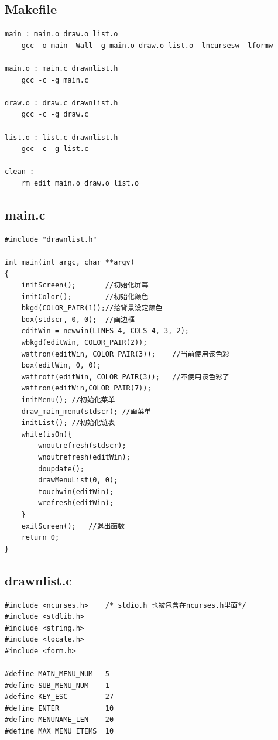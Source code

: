\documentclass[10pt,a4paper]{article}
\begin{document}
\subsection{Makefile}
\begin{footnotesize}
\begin{verbatim}
main : main.o draw.o list.o
	gcc -o main -Wall -g main.o draw.o list.o -lncursesw -lformw

main.o : main.c drawnlist.h
	gcc -c -g main.c 

draw.o : draw.c drawnlist.h
	gcc -c -g draw.c 

list.o : list.c drawnlist.h
	gcc -c -g list.c 

clean :
	rm edit main.o draw.o list.o
\end{verbatim}
\end{footnotesize}
\begin{footnotesize}
\subsection{main.c}
\begin{verbatim}
#include "drawnlist.h"

int main(int argc, char **argv)
{
    initScreen();       //初始化屏幕
    initColor();        //初始化颜色
    bkgd(COLOR_PAIR(1));//给背景设定颜色
    box(stdscr, 0, 0);  //画边框
    editWin = newwin(LINES-4, COLS-4, 3, 2);
    wbkgd(editWin, COLOR_PAIR(2));
    wattron(editWin, COLOR_PAIR(3));    //当前使用该色彩
    box(editWin, 0, 0);
    wattroff(editWin, COLOR_PAIR(3));   //不使用该色彩了
    wattron(editWin,COLOR_PAIR(7));
    initMenu(); //初始化菜单
    draw_main_menu(stdscr); //画菜单
    initList(); //初始化链表
    while(isOn){
        wnoutrefresh(stdscr);
        wnoutrefresh(editWin);
        doupdate();
        drawMenuList(0, 0);
        touchwin(editWin);
        wrefresh(editWin);
    }
    exitScreen();   //退出函数
    return 0;
}
\end{verbatim}
\subsection{drawnlist.c}
\begin{verbatim}
#include <ncurses.h>	/* stdio.h 也被包含在ncurses.h里面*/
#include <stdlib.h>
#include <string.h>
#include <locale.h>
#include <form.h>

#define MAIN_MENU_NUM	5
#define SUB_MENU_NUM	1
#define KEY_ESC			27
#define ENTER			10
#define MENUNAME_LEN	20
#define MAX_MENU_ITEMS	10


\end{verbatim}
\end{footnotesize}
\end{document}
